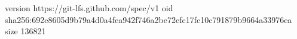 version https://git-lfs.github.com/spec/v1
oid sha256:692e8605d9b79a4d0a4fea942f746a2be72efc17fc10c791879b9664a33976ea
size 136821
